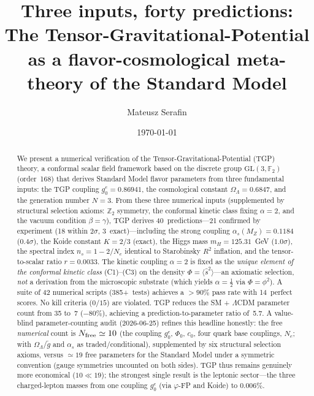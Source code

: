 \documentclass[aps,prl,twocolumn,superscriptaddress,showpacs,floatfix]{revtex4-2}
\newcommand{\gone}{{g_0^e}}
\newcommand{\OL}{\Omega_\Lambda}
\newcommand{\GL}{\mathrm{GL}(3,\mathbb{F}_2)}
\newcommand{\as}{\alpha_s}
\begin{document}
\title{Three inputs, forty predictions:\\
  The Tensor-Gravitational-Potential as a flavor-cosmological
  meta-theory of the Standard Model}

\author{Mateusz Serafin}

\date{\today}

\begin{abstract}
We present a numerical verification of the Tensor-Gravitational-Potential
(TGP) theory, a conformal scalar field framework based on the discrete
group $\GL$ (order~168) that derives Standard Model flavor parameters
from three fundamental inputs:
the TGP coupling $\gone = 0.86941$,
the cosmological constant $\OL = 0.6847$,
and the generation number $N = 3$.
From these three numerical inputs (supplemented by structural selection
axioms: $\mathbb{Z}_2$ symmetry, the conformal kinetic class fixing $\alpha=2$, and
the vacuum condition $\beta=\gamma$), TGP derives 40~predictions---21 confirmed by
experiment (18 within $2\sigma$, 3~exact)---including the strong coupling
$\as(M_Z) = 0.1184$ ($0.4\sigma$), the Koide constant $K = 2/3$ (exact),
the Higgs mass $m_H = 125.31$~GeV ($1.0\sigma$), the spectral index
$n_s = 1 - 2/N_e$ identical to Starobinsky $R^2$ inflation, and the
tensor-to-scalar ratio $r = 0.0033$.
The kinetic coupling $\alpha = 2$ is fixed as the \emph{unique element of
the conformal kinetic class} (C1)--(C3) on the density $\Phi=\langle\hat s^2\rangle$---an
axiomatic selection, \emph{not} a derivation from the microscopic substrate
(which yields $\alpha=\tfrac12$ via $\Phi = \phi^2$).
A suite of 42 numerical scripts (385+~tests) achieves a $> 90\%$ pass rate
with 14~perfect scores.
No kill criteria ($0/15$) are violated.
TGP reduces the SM + $\Lambda$CDM parameter count from 35 to~7 ($-80\%$),
achieving a prediction-to-parameter ratio of~5.7.
A value-blind parameter-counting audit (2026-06-25) refines this headline
honestly: the free \emph{numerical} count is $N_{\rm free}\simeq 10$
(the coupling $\gone$, $\Phi_0$, $c_0$, four quark base couplings, $N_e$;
with $\OL/\tilde g$ and $\as$ as traded/conditional), supplemented by six
structural selection axioms, versus $\simeq 19$ free parameters for the
Standard Model under a symmetric convention (gauge symmetries uncounted on
both sides). TGP thus remains genuinely more economical ($10 \ll 19$); the
strongest single result is the leptonic sector---the three charged-lepton
masses from one coupling $\gone$ (via $\varphi$-FP and Koide) to $0.006\%$.
\end{abstract}
\end{document}
